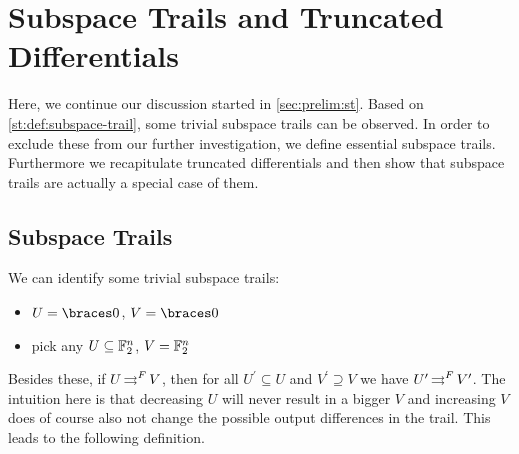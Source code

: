 \section{Subspace Trails and Truncated Differentials}\label{sec:st:prelim}

Here, we continue our discussion started in \cref{sec:prelim:st}.
Based on \cref{st:def:subspace-trail}, some trivial subspace trails can be observed.
In order to exclude these from our further investigation, we define essential subspace trails.
Furthermore we recapitulate truncated differentials and then show that subspace trails are actually a special case of them.

\subsection{Subspace Trails}

We can identify some trivial subspace trails:
\begin{itemize}
    \item $U = \set{0}$, $V = \set{0}$
    \item pick any $U \subseteq \mathbb{F}_2^n$, $V = \mathbb{F}_2^n$
\end{itemize}
Besides these, if $U \operatorname*{\rightrightarrows}^{F}_{} V$, then for all $U^\prime \subseteq U$ and $V^\prime \supseteq V$ we have $U^\prime \operatorname*{\rightrightarrows}^{F}_{} V^\prime$.
The intuition here is that decreasing $U$ will never result in a bigger $V$ and increasing $V$ does of course also not change the possible output differences in the trail.
This leads to the following definition.

